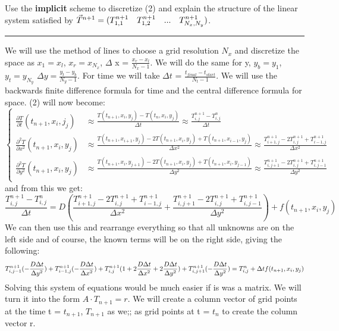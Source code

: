 \documentclass[12pt]{article}
\begin{document}
\noindent Use the \textbf{implicit} scheme to discretize (2) and explain the structure of the linear system satisfied by $\vec{T}^{n+1} = (T_{1,1}^{n+1}\hspace{.35cm}T_{1,2}^{n+1}\hspace{.35cm}...\hspace{.35cm}T_{N_{x},N_{y}}^{n+1})$.
\begin{center}
\rule{10cm}{0.4pt}
\end{center}
We will use the method of lines to choose a grid resolution $N_x$ and discretize the space as $x_1 = x_l$, $x_r = x_{N_x}$, $\Delta$ x = $\frac{x_r - x_l}{N_x - 1}$. We will do the same for y, $y_b = y_1$, $y_t = y_{N_y}$ $\Delta y = \frac{y_t - y_b}{N_y - 1}$. For time we will take $\Delta t$ = $\frac{t_{final} - t_{start}}{N_t - 1}$. We will use the backwards finite difference formula for time and the central difference formula for space. (2) will now become:
\begin{equation}
\left\{
\begin{aligned}
\frac{\partial T}{\partial t}(t_{n+1},x_i,j_j) &\approx \frac{T(t_{n+1},x_i,y_j) - T(t_n,x_i,y_j)}{\Delta t} \approx\frac{T^{n+1}_{i,j} - T^n_{i,j}}{\Delta t} \\
\frac{\partial^2 T}{\partial x^2}(t_{n+1},x_i,y_j) &\approx \frac{T(t_{n+1},x_{i+1},y_j) - 2T(t_{n+1},x_i,y_j) +T(t_{n+1},x_{i-1},y_j)}{\Delta x^2} \approx \frac{T^{n+1}_{i+1,j} - 2T^{n+1}_{i,j} + T^{n+1}_{i-1,j}}{\Delta x^2}\\
\frac{\partial^2 T}{\partial y^2}(t_{n+1},x_i,y_j) &\approx \frac{T(t_{n+1},x_i,y_{j+1}) - 2T(t_{n+1},x_i,y_j) +T(t_{n+1},x_i,y_{j-1})}{\Delta y^2} \approx \frac{T^{n+1}_{i,j+1} - 2T^{n+1}_{i,j} + T^{n+1}_{i,j-1}}{\Delta y^2}\\
\end{aligned}\right.
\end{equation}
\noindent and from this we get:
\begin{equation}
\frac{T^{n+1}_{i,j} - T^n_{i,j}}{\Delta t} = D(\frac{T^{n+1}_{i+1,j} - 2T^{n+1}_{i,j} + T^{n+1}_{i-1,j}}{\Delta x^2} + \frac{T^{n+1}_{i,j+1} - 2T^{n+1}_{i,j} + T^{n+1}_{i,j-1}}{\Delta y^2}) + f(t_{n+1},x_i,y_j)
\end{equation}
We can then use this and rearrange everything so that all unknowns are on the left side and of course, the known terms will be on the right side, giving the following:
\begin{equation}
T^{n+1}_{i,j-1}(-\frac{D\Delta t}{\Delta y^2}) + T^{n+1}_{i-1,j}(-\frac{D\Delta t}{\Delta x^2}) + T^{n+1}_{i,j}(1 + 2\frac{D\Delta t}{\Delta x^2} + 2\frac{D\Delta t}{\Delta y^2})\\
+ T^{n+1}_{i,j+1}(-\frac{D\Delta t}{\Delta y^2}) = T^n_{i,j} + \Delta t f(t_{n+1},x_i,y_j)
\end{equation}
Solving this system of equations would be much easier if is was a matrix. We will turn it into the form $A\cdot T_{n+1} = r$. We will create a column vector of grid points at the time t = $t_{n+1}$, $T_{n+1}$ as we;; as grid points at t = $t_n$ to create the column vector r.
\end{document}
